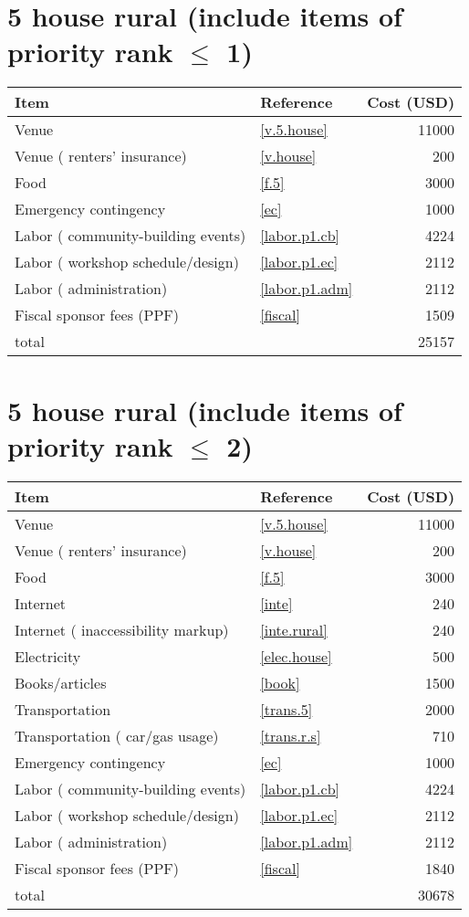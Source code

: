 \section*{5 house rural (include items of priority rank $\leq$ 1)}
\begin{center}
\begin{tabular}{llr}
Item & Reference & Cost (USD) \\ \hline
Venue & \ref{v.5.house} & 11000 \\
Venue ( renters' insurance) & \ref{v.house} & 200 \\
Food & \ref{f.5} & 3000 \\
Emergency contingency & \ref{ec} & 1000 \\
Labor ( community-building events) & \ref{labor.p1.cb} & 4224 \\
Labor ( workshop schedule/design) & \ref{labor.p1.ec} & 2112 \\
Labor ( administration) & \ref{labor.p1.adm} & 2112 \\
Fiscal sponsor fees (PPF) & \ref{fiscal} & 1509 \\ \hline
total &  & 25157
\end{tabular}
\end{center}
\newpage
\section*{5 house rural (include items of priority rank $\leq$ 2)}
\begin{center}
\begin{tabular}{llr}
Item & Reference & Cost (USD) \\ \hline
Venue & \ref{v.5.house} & 11000 \\
Venue ( renters' insurance) & \ref{v.house} & 200 \\
Food & \ref{f.5} & 3000 \\
Internet & \ref{inte} & 240 \\
Internet ( inaccessibility markup) & \ref{inte.rural} & 240 \\
Electricity & \ref{elec.house} & 500 \\
Books/articles & \ref{book} & 1500 \\
Transportation & \ref{trans.5} & 2000 \\
Transportation ( car/gas usage) & \ref{trans.r.s} & 710 \\
Emergency contingency & \ref{ec} & 1000 \\
Labor ( community-building events) & \ref{labor.p1.cb} & 4224 \\
Labor ( workshop schedule/design) & \ref{labor.p1.ec} & 2112 \\
Labor ( administration) & \ref{labor.p1.adm} & 2112 \\
Fiscal sponsor fees (PPF) & \ref{fiscal} & 1840 \\ \hline
total &  & 30678
\end{tabular}
\end{center}
\newpage

